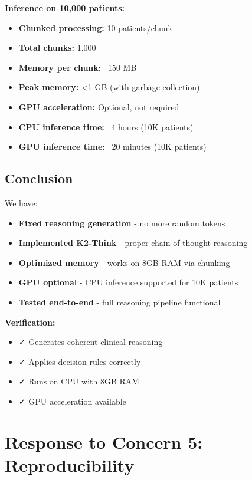 \documentclass[11pt]{article}
\begin{document}
\textbf{Inference on 10,000 patients:}
\begin{itemize}
    \item \textbf{Chunked processing:} 10 patients/chunk
    \item \textbf{Total chunks:} 1,000
    \item \textbf{Memory per chunk:} ~150 MB
    \item \textbf{Peak memory:} <1 GB (with garbage collection)
    \item \textbf{GPU acceleration:} Optional, not required
    \item \textbf{CPU inference time:} ~4 hours (10K patients)
    \item \textbf{GPU inference time:} ~20 minutes (10K patients)
\end{itemize}

\subsection{Conclusion}

We have:
\begin{itemize}
    \item \textbf{Fixed reasoning generation} - no more random tokens
    \item \textbf{Implemented K2-Think} - proper chain-of-thought reasoning
    \item \textbf{Optimized memory} - works on 8GB RAM via chunking
    \item \textbf{GPU optional} - CPU inference supported for 10K patients
    \item \textbf{Tested end-to-end} - full reasoning pipeline functional
\end{itemize}

\textbf{Verification:}
\begin{itemize}
    \item ✓ Generates coherent clinical reasoning
    \item ✓ Applies decision rules correctly
    \item ✓ Runs on CPU with 8GB RAM
    \item ✓ GPU acceleration available
\end{itemize}

\newpage
\section{Response to Concern 5: Reproducibility}
\end{document}
